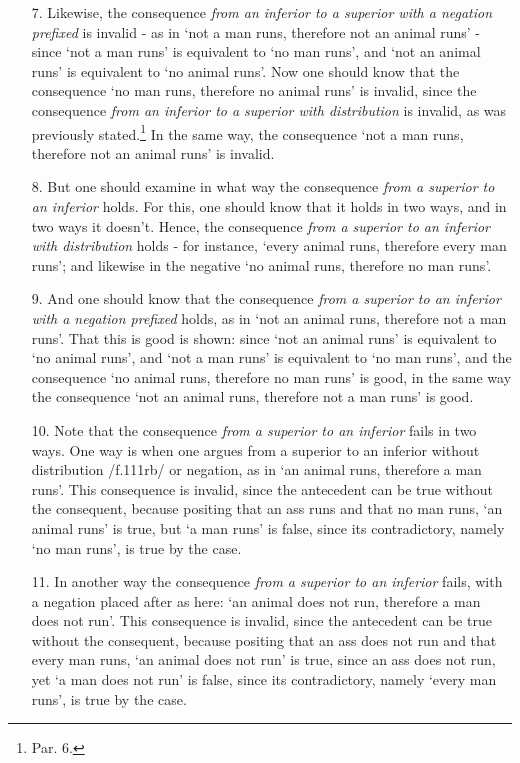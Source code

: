 \begin{enumerate}
\item[7.] Likewise, the consequence \textit{from an inferior to a superior with a negation prefixed} is invalid - as in `not a man runs, therefore not an animal runs' - since `not a man runs' is equivalent to `no man runs', and `not an animal runs' is equivalent to `no animal runs'. Now one should know that the consequence `no man runs, therefore no animal runs' is invalid, since the consequence \textit{from an inferior to a superior with distribution} is invalid, as was previously stated.\footnote{Par. 6.} In the same way, the consequence `not a man runs, therefore not an animal runs' is invalid.
\item[8.] But one should examine in what way the consequence \textit{from a superior to an inferior} holds. For this, one should know that it holds in two ways, and in two ways it doesn't. Hence, the consequence \textit{from a superior to an inferior with distribution} holds - for instance, `every animal runs, therefore every man runs'; and likewise in the negative `no animal runs, therefore no man runs'.
\item[9.] And one should know that the consequence \textit{from a superior to an inferior with a negation prefixed} holds, as in `not an animal runs, therefore not a man runs'. That this is good is shown: since `not an animal runs' is equivalent to `no animal runs', and `not a man runs' is equivalent to `no man runs', and the consequence `no animal runs, therefore no man runs' is good, in the same way the consequence `not an animal runs, therefore not a man runs' is good.
\item[10.] Note that the consequence \textit{from a superior to an inferior} fails in two ways. One way is when one argues from a superior to an inferior without distribution /f.111rb/ or negation, as in `an animal runs, therefore a man runs'. This consequence is invalid, since the antecedent can be true without the consequent, because positing that an ass runs and that no man runs, `an animal runs' is true, but `a man runs' is false, since its contradictory, namely `no man runs', is true by the case.
\item[11.] In another way the consequence \textit{from a superior to an inferior} fails, with a negation placed after as here: `an animal does not run, therefore a man does not run'. This consequence is invalid, since the antecedent can be true without the consequent, because positing that an ass does not run and that every man runs, `an animal does not run' is true, since an ass does not run, yet `a man does not run' is false, since its contradictory, namely `every man runs', is true by the case.

\end{enumerate}
